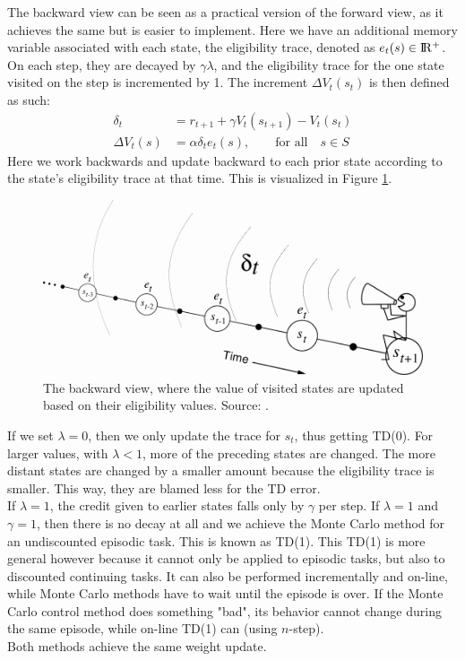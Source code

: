 The backward view can be seen as a practical version of the forward view, as it achieves the same but is easier to implement.
Here we have an additional memory variable associated with each state, the eligibility trace, denoted as $e_t(s) \in \rm I\!R^+$. On each step, they are decayed by $\gamma \lambda$, and the eligibility trace for the one state visited on the step is incremented by 1. The increment $\Delta V_t(s_t)$ is then defined as such:
\begin{subequations}
\label{eq:backview}
\begin{align}
\delta_t &= r_{t+1} + \gamma V_t(s_{t+1}) - V_t(s_t) \label{eq:backview1} \\
\Delta V_t(s) &= \alpha \delta_t e_t(s), \qquad \text{for all} \quad s \in S \label{eq:backview2}
\end{align}
\end{subequations}
Here we work backwards and update backward to each prior state according to the state's eligibility trace at that time. This is visualized in Figure \ref{fig:TDBackwardView}.
\begin{figure}[htb]
\includegraphics[width=.9\linewidth]{images/TDBackwardView.png}
\caption[TD backward view]{The backward view, where the value of visited states are updated based on their eligibility values. Source: \cite{Sutton1998ReinforcementIntroduction}.}
\label{fig:TDBackwardView}
\end{figure}
If we set $\lambda = 0$, then we only update the trace for $s_t$, thus getting TD(0).
For larger values, with $\lambda < 1$, more of the preceding states are changed.
The more distant states are changed by a smaller amount because the eligibility trace is smaller.
This way, they are blamed less for the TD error.\\
If $\lambda = 1$, the credit given to earlier states falls only by $\gamma$ per step.
If $\lambda = 1$ and $\gamma = 1$, then there is no decay at all and we achieve the Monte Carlo method for an undiscounted episodic task.
This is known as TD(1).
This TD(1) is more general however because it cannot only be applied to episodic tasks, but also to discounted continuing tasks.
It can also be performed incrementally and on-line, while Monte Carlo methods have to wait until the episode is over.
If the Monte Carlo control method does something "bad", its behavior cannot change during the same episode, while on-line TD(1) can (using $n$-step).\\
Both methods achieve the same weight update.\\

